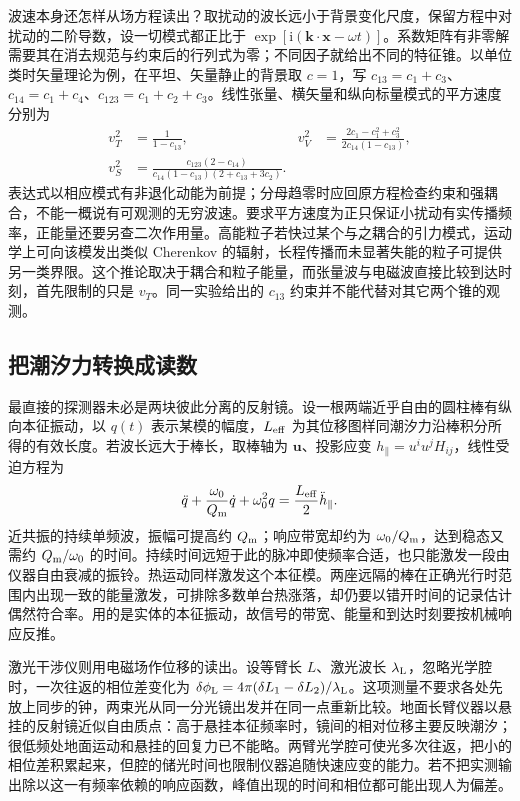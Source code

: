 波速本身还怎样从场方程读出？取扰动的波长远小于背景变化尺度，保留方程中对扰动的二阶导数，设一切模式都正比于 $\exp[\mathrm{i}(\bm k\cdot\bm x-\omega t)]$。系数矩阵有非零解需要其在消去规范与约束后的行列式为零；不同因子就给出不同的特征锥。以单位类时矢量理论为例，在平坦、矢量静止的背景取 $c=1$，写 $c_{13}=c_1+c_3$、$c_{14}=c_1+c_4$、$c_{123}=c_1+c_2+c_3$。线性张量、横矢量和纵向标量模式的平方速度分别为
\begin{align*}
 v_T^2&=\frac{1}{1-c_{13}},&
 v_V^2&=\frac{2c_1-c_1^2+c_3^2}{2c_{14}(1-c_{13})},\\
 v_S^2&=\frac{c_{123}(2-c_{14})}
    {c_{14}(1-c_{13})(2+c_{13}+3c_2)} .
\end{align*}
表达式以相应模式有非退化动能为前提；分母趋零时应回原方程检查约束和强耦合，不能一概说有可观测的无穷波速。要求平方速度为正只保证小扰动有实传播频率，正能量还要另查二次作用量。高能粒子若快过某个与之耦合的引力模式，运动学上可向该模发出类似 Cherenkov 的辐射，长程传播而未显著失能的粒子可提供另一类界限。这个推论取决于耦合和粒子能量，而张量波与电磁波直接比较到达时刻，首先限制的只是 $v_T$。同一实验给出的 $c_{13}$ 约束并不能代替对其它两个锥的观测。

\subsection{把潮汐力转换成读数}

最直接的探测器未必是两块彼此分离的反射镜。设一根两端近乎自由的圆柱棒有纵向本征振动，以 $q(t)$ 表示某模的幅度，$L_{\rm eff}$ 为其位移图样同潮汐力沿棒积分所得的有效长度。若波长远大于棒长，取棒轴为 $\bm u$、投影应变 $h_\parallel=u^iu^jH_{ij}$，线性受迫方程为
\[
 \ddot q+\frac{\omega_0}{Q_{\rm m}}\dot q+\omega_0^2q
        =\frac{L_{\rm eff}}{2}\ddot h_\parallel .
\]
近共振的持续单频波，振幅可提高约 $Q_{\rm m}$；响应带宽却约为 $\omega_0/Q_{\rm m}$，达到稳态又需约 $Q_{\rm m}/\omega_0$ 的时间。持续时间远短于此的脉冲即使频率合适，也只能激发一段由仪器自由衰减的振铃。热运动同样激发这个本征模。两座远隔的棒在正确光行时范围内出现一致的能量激发，可排除多数单台热涨落，却仍要以错开时间的记录估计偶然符合率。用的是实体的本征振动，故信号的带宽、能量和到达时刻要按机械响应反推。

激光干涉仪则用电磁场作位移的读出。设等臂长 $L$、激光波长 $\lambda_{\rm L}$，忽略光学腔时，一次往返的相位差变化为 $\delta\phi_{\rm L}=4\pi(\delta L_1-\delta L_2)/\lambda_{\rm L}$。这项测量不要求各处先放上同步的钟，两束光从同一分光镜出发并在同一点重新比较。地面长臂仪器以悬挂的反射镜近似自由质点：高于悬挂本征频率时，镜间的相对位移主要反映潮汐；很低频处地面运动和悬挂的回复力已不能略。两臂光学腔可使光多次往返，把小的相位差积累起来，但腔的储光时间也限制仪器追随快速应变的能力。若不把实测输出除以这一有频率依赖的响应函数，峰值出现的时间和相位都可能出现人为偏差。


